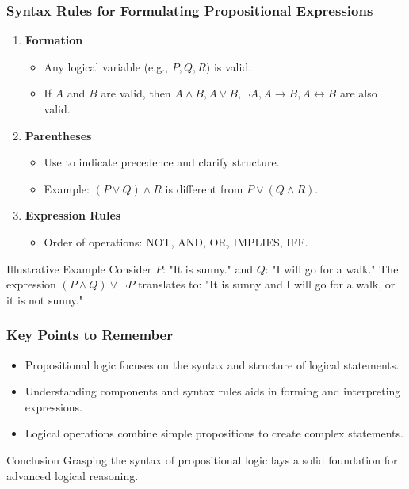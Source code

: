 \documentclass[aspectratio=169]{beamer}
\begin{document}
\begin{frame}[fragile]
    \frametitle{Syntax Rules for Formulating Propositional Expressions}
    \begin{enumerate}
        \item \textbf{Formation}
        \begin{itemize}
            \item Any logical variable (e.g., \( P, Q, R \)) is valid.
            \item If \( A \) and \( B \) are valid, then \( A \land B, A \lor B, \neg A, A \rightarrow B, A \leftrightarrow B \) are also valid.
        \end{itemize}
        
        \item \textbf{Parentheses}
        \begin{itemize}
            \item Use to indicate precedence and clarify structure.
            \item Example: \( (P \lor Q) \land R \) is different from \( P \lor (Q \land R) \).
        \end{itemize}
        
        \item \textbf{Expression Rules}
        \begin{itemize}
            \item Order of operations: NOT, AND, OR, IMPLIES, IFF.
        \end{itemize}
    \end{enumerate}
    
    \begin{block}{Illustrative Example}
        Consider \( P \): "It is sunny." and \( Q \): "I will go for a walk."
        The expression \( (P \land Q) \lor \neg P \) translates to:
        "It is sunny and I will go for a walk, or it is not sunny."
    \end{block}
\end{frame}

\begin{frame}[fragile]
    \frametitle{Key Points to Remember}
    \begin{itemize}
        \item Propositional logic focuses on the syntax and structure of logical statements.
        \item Understanding components and syntax rules aids in forming and interpreting expressions.
        \item Logical operations combine simple propositions to create complex statements.
    \end{itemize}
    
    \begin{block}{Conclusion}
        Grasping the syntax of propositional logic lays a solid foundation for advanced logical reasoning.
    \end{block}
\end{frame}
\end{document}
